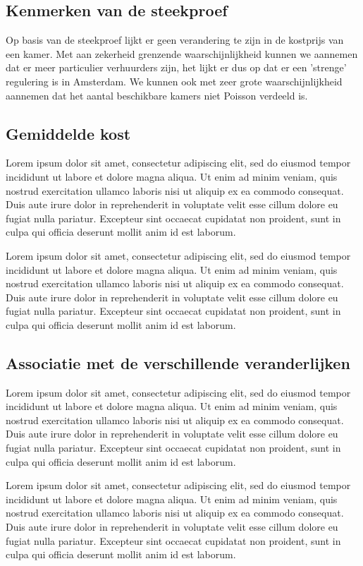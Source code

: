 \documentclass[a4paper]{kulakarticle}
\begin{document}
	\subsection{Kenmerken van de steekproef}
Op basis van de steekproef lijkt er geen verandering te zijn in de kostprijs van een kamer. Met aan zekerheid grenzende waarschijnlijkheid kunnen we aannemen dat er meer particulier verhuurders zijn, het lijkt er dus op dat er een 'strenge' regulering is in Amsterdam. We kunnen ook met zeer grote waarschijnlijkheid aannemen dat het aantal beschikbare kamers niet Poisson verdeeld is.
	
	\subsection{Gemiddelde kost}
	Lorem ipsum dolor sit amet, consectetur adipiscing elit, sed do eiusmod tempor incididunt ut labore et dolore magna aliqua. Ut enim ad minim veniam, quis nostrud exercitation ullamco laboris nisi ut aliquip ex ea commodo consequat. Duis aute irure dolor in reprehenderit in voluptate velit esse cillum dolore eu fugiat nulla pariatur. Excepteur sint occaecat cupidatat non proident, sunt in culpa qui officia deserunt mollit anim id est laborum.
	
	Lorem ipsum dolor sit amet, consectetur adipiscing elit, sed do eiusmod tempor incididunt ut labore et dolore magna aliqua. Ut enim ad minim veniam, quis nostrud exercitation ullamco laboris nisi ut aliquip ex ea commodo consequat. Duis aute irure dolor in reprehenderit in voluptate velit esse cillum dolore eu fugiat nulla pariatur. Excepteur sint occaecat cupidatat non proident, sunt in culpa qui officia deserunt mollit anim id est laborum.
	
	\subsection{Associatie met de verschillende veranderlijken}
	Lorem ipsum dolor sit amet, consectetur adipiscing elit, sed do eiusmod tempor incididunt ut labore et dolore magna aliqua. Ut enim ad minim veniam, quis nostrud exercitation ullamco laboris nisi ut aliquip ex ea commodo consequat. Duis aute irure dolor in reprehenderit in voluptate velit esse cillum dolore eu fugiat nulla pariatur. Excepteur sint occaecat cupidatat non proident, sunt in culpa qui officia deserunt mollit anim id est laborum.
	
	Lorem ipsum dolor sit amet, consectetur adipiscing elit, sed do eiusmod tempor incididunt ut labore et dolore magna aliqua. Ut enim ad minim veniam, quis nostrud exercitation ullamco laboris nisi ut aliquip ex ea commodo consequat. Duis aute irure dolor in reprehenderit in voluptate velit esse cillum dolore eu fugiat nulla pariatur. Excepteur sint occaecat cupidatat non proident, sunt in culpa qui officia deserunt mollit anim id est laborum.
	
\end{document}
